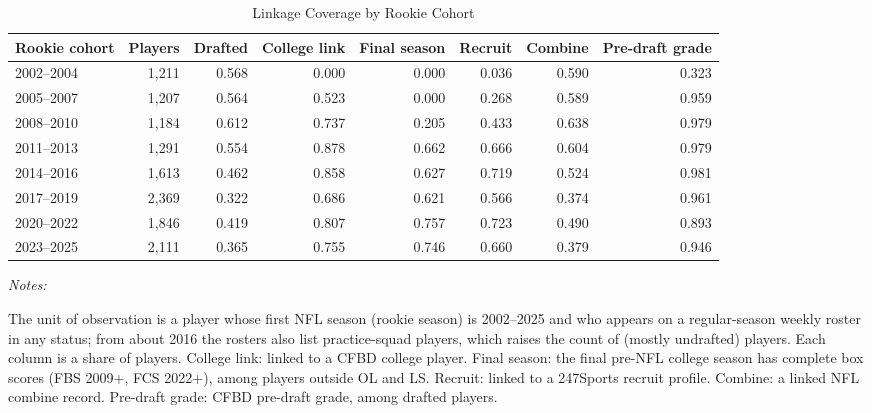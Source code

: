\begin{table}[!h]
\centering
\caption{Linkage Coverage by Rookie Cohort \label{tab:linkage-cohort}}
\centering
\fontsize{9}{11}\selectfont
\begin{threeparttable}
\begin{tabular}[t]{lrrrrrrr}
\toprule
Rookie cohort & Players & Drafted & College link & Final season & Recruit & Combine & Pre-draft grade\\
\midrule
2002--2004 & 1,211 & 0.568 & 0.000 & 0.000 & 0.036 & 0.590 & 0.323\\
2005--2007 & 1,207 & 0.564 & 0.523 & 0.000 & 0.268 & 0.589 & 0.959\\
2008--2010 & 1,184 & 0.612 & 0.737 & 0.205 & 0.433 & 0.638 & 0.979\\
2011--2013 & 1,291 & 0.554 & 0.878 & 0.662 & 0.666 & 0.604 & 0.979\\
2014--2016 & 1,613 & 0.462 & 0.858 & 0.627 & 0.719 & 0.524 & 0.981\\
2017--2019 & 2,369 & 0.322 & 0.686 & 0.621 & 0.566 & 0.374 & 0.961\\
2020--2022 & 1,846 & 0.419 & 0.807 & 0.757 & 0.723 & 0.490 & 0.893\\
2023--2025 & 2,111 & 0.365 & 0.755 & 0.746 & 0.660 & 0.379 & 0.946\\
\bottomrule
\end{tabular}
\begin{tablenotes}[para]
\item \textit{Notes:} 
\item The unit of observation is a player whose first NFL season (rookie season) is 2002--2025 and who appears on a regular-season weekly roster in any status; from about 2016 the rosters also list practice-squad players, which raises the count of (mostly undrafted) players. Each column is a share of players. College link: linked to a CFBD college player. Final season: the final pre-NFL college season has complete box scores (FBS 2009+, FCS 2022+), among players outside OL and LS. Recruit: linked to a 247Sports recruit profile. Combine: a linked NFL combine record. Pre-draft grade: CFBD pre-draft grade, among drafted players.
\end{tablenotes}
\end{threeparttable}
\end{table}
